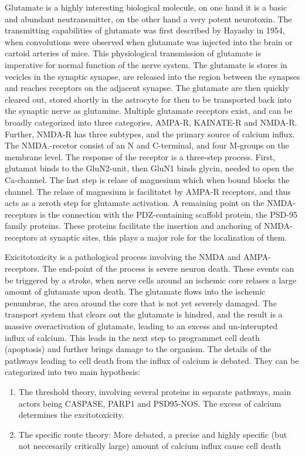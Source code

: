 \documentclass[12p]{article}
\begin{document}
Glutamate is a highly interesting biological molecule, on one hand it is a basic and abundant neutransmitter, on the other hand a very potent neurotoxin.
The transmitting capabilities of glutamate was first described by Hayashy in 1954, when convolutions were observed when glutamate was injected into the brain or cartoid arteries of mice.
This physiological transmission of glutamate is imperative for normal function of the nerve system.
The glutamate is stores in vecicles in the synaptic synapse, are released into the region between the synapses and reaches receptors on the adjacent synapse.
The glutamate are then quickly cleared out, stored shortly in the astrocyte for then to be transported back into the synaptic nerve as glutamine.
Multiple glutamate receptors exist, and can be broadly categorized into three categories, AMPA-R, KAINATE-R and NMDA-R.
Further, NMDA-R has three subtypes, and the primary source of calcium influx.
The NMDA.-recetor consist of an N and C-terminal, and four M-groups on the membrane level.
The response of the receptor is a three-step process.
First, glutamat binds to the GluN2-unit, then GluN1 binds glycin, needed to open the Ca-channel.
The last step is relase of magnesium which when bound blocks the channel.
The relase of magnesium is facilitatet by AMPA-R receptors, and thus acts as a zeroth step for glutamate activation.
A remaining point on the NMDA-receptors is the connection with the PDZ-containing scaffold protein, the PSD-95 family proteins.
These proteins facilitate the insertion and anchoring of NMDA-receptors at synaptic sites, this plays a major role for the localization of them.

Exicitotoxicity is a pathological process involving the NMDA and AMPA-receptors.
The end-point of the process is severe neuron death.
These events can be triggered by a stroke, when nerve cells around an ischemic core relases a large amount of glutamate upon death.
The glutamate flows into the ischemic penumbrae, the area around the core that is not yet severely damaged.
The transport system that clears out the glutamate is hindred, and the result is a massive overactivation of glutamate, leading to an excess and un-interupted influx of calcium.
This leads in the next step to programmet cell death (apoptosis) and further brings damage to the organism.
The details of the pathways leading to cell death from the influx of calcium is debated.
They can be categorized into two main hypothesis:

\begin{enumerate}
\item
The threshold theory, involving several proteins in separate pathways, main actors being CASPASE, PARP1 and PSD95-NOS. The excess of calcium determines the excitotoxicity.
\item
The specific route theory: More debated, a precise and highly specific (but not neccesarily critically large) amount of calcium influx cause cell death
\end{enumerate}
\end{document}

